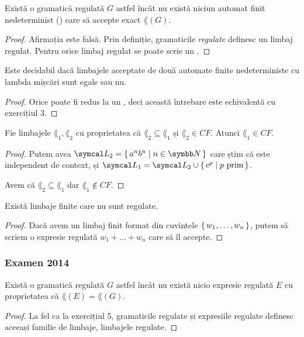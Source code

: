 \begin{exercise}
    Există o gramatică regulată \(G\) astfel încât nu există niciun automat finit nedeterminist (\nfa) care să accepte exact \(\lang(G)\).
\end{exercise}
\begin{proof}
    Afirmația este falsă. Prin definiție, gramaticile \emph{regulate} definesc un limbaj regulat. Pentru orice limbaj regulat se poate scrie un \nfa{}.
\end{proof}

\begin{exercise}
    Este decidabil dacă limbajele acceptate de două automate finite nedeterministe cu lambda mișcări sunt egale sau nu.
\end{exercise}
\begin{proof}
    Orice \lnfa{} poate fi redus la un \dfa{}, deci această întrebare este echivalentă cu exercițiul 3.
\end{proof}

\begin{exercise}
    Fie limbajele \(\lang_1, \lang_2\) cu proprietatea că \(\lang_2 \subseteq \lang_1\) și \(\lang_2 \in CF\). Atunci \(\lang_1 \in CF\).
\end{exercise}
\begin{proof}
    Putem avea \(\lang_2 = \set{ a^n b^n | n \in \naturals }\) care știm că este independent de context, și \(\lang_1 = \lang_2 \cup \set{ c^p | p \text{ prim} }\).

    Avem că \(\lang_2 \subseteq \lang_1\) dar \(\lang_1 \not\in CF\).
\end{proof}

\begin{exercise}
    Există limbaje finite care nu sunt regulate.
\end{exercise}
\begin{proof}
    Dacă avem un limbaj finit format din cuvintele \(\set{ w_1, \dots, w_n }\), putem să scriem o expresie regulată \(w_1 + \dots + w_n\) care să îl accepte.
\end{proof}

\subsubsection*{Examen 2014}

\begin{exercise}
    Există o gramatică regulată \(G\) astfel încât nu există nicio expresie regulată \(E\) cu proprietatea că \(\lang(E) = \lang(G)\).
\end{exercise}
\begin{proof}
    La fel ca la exercițiul 5, gramaticile regulate și expresiile regulate definesc aceeași familie de limbaje, limbajele regulate.
\end{proof}

